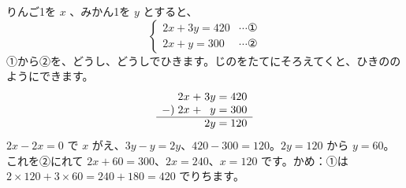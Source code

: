 りんご1を $x$ 、みかん1を $y$ とすると、
\[ \begin{cases} 2x+3y=420 & \cdots\text{①}\\ 2x+y=300 & \cdots\text{②} \end{cases} \]
①から②を、どうし、どうしでひきます。じのをたてにそろえてくと、ひきののようにできます。
\[ \begin{array}{r@{\;}r@{\;}c@{\;}r@{\;}c@{\;}r}
 & 2x & + & 3y & = & 420\\
-) & 2x & + & y & = & 300\\ \hline
 & & & 2y & = & 120
\end{array} \]
$2x-2x=0$ で $x$ がえ、$3y-y=2y$、$420-300=120$。$2y=120$ から $y=60$。これを②にれて $2x+60=300$、$2x=240$、$x=120$ です。かめ：①は $2\times120+3\times60=240+180=420$ でりちます。

